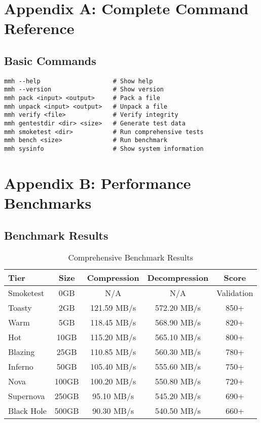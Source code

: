 \documentclass[12pt,a4paper]{article}
\begin{document}
\section{Appendix A: Complete Command Reference}
\subsection{Basic Commands}
\begin{lstlisting}[caption=Complete Command Reference]
mmh --help                    # Show help
mmh --version                 # Show version
mmh pack <input> <output>     # Pack a file
mmh unpack <input> <output>   # Unpack a file
mmh verify <file>             # Verify integrity
mmh gentestdir <dir> <size>   # Generate test data
mmh smoketest <dir>           # Run comprehensive tests
mmh bench <size>              # Run benchmark
mmh sysinfo                   # Show system information
\end{lstlisting}

\section{Appendix B: Performance Benchmarks}
\subsection{Benchmark Results}
\begin{table}[h]
\centering
\begin{tabular}{|l|c|c|c|c|}
\hline
\textbf{Tier} & \textbf{Size} & \textbf{Compression} & \textbf{Decompression} & \textbf{Score} \\
\hline
Smoketest & 0GB & N/A & N/A & Validation \\
Toasty & 2GB & 121.59 MB/s & 572.20 MB/s & 850+ \\
Warm & 5GB & 118.45 MB/s & 568.90 MB/s & 820+ \\
Hot & 10GB & 115.20 MB/s & 565.10 MB/s & 800+ \\
Blazing & 25GB & 110.85 MB/s & 560.30 MB/s & 780+ \\
Inferno & 50GB & 105.40 MB/s & 555.60 MB/s & 750+ \\
Nova & 100GB & 100.20 MB/s & 550.80 MB/s & 720+ \\
Supernova & 250GB & 95.10 MB/s & 545.20 MB/s & 690+ \\
Black Hole & 500GB & 90.30 MB/s & 540.50 MB/s & 660+ \\
\hline
\end{tabular}
\caption{Comprehensive Benchmark Results}
\end{table}
\end{document}
